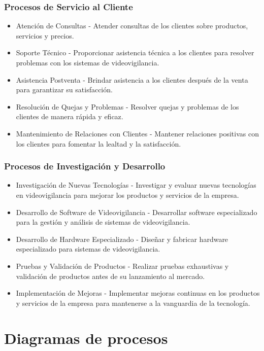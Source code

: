 \documentclass{report}
\begin{document}
        \subsubsection*{Procesos de Servicio al Cliente}
          \begin{itemize}
            \item Atención de Consultas - Atender consultas de los clientes sobre productos, servicios y precios.
            \item Soporte Técnico - Proporcionar asistencia técnica a los clientes para resolver problemas con los sistemas de videovigilancia.
            \item Asistencia Postventa - Brindar asistencia a los clientes después de la venta para garantizar su satisfacción.
            \item Resolución de Quejas y Problemas - Resolver quejas y problemas de los clientes de manera rápida y eficaz.
            \item Mantenimiento de Relaciones con Clientes - Mantener relaciones positivas con los clientes para fomentar la lealtad y la satisfacción.
          \end{itemize}
        \subsubsection*{Procesos de Investigación y Desarrollo}
          \begin{itemize}
            \item Investigación de Nuevas Tecnologías - Investigar y evaluar nuevas tecnologías en videovigilancia para mejorar los productos y servicios de la empresa.
            \item Desarrollo de Software de Videovigilancia - Desarrollar software especializado para la gestión y análisis de sistemas de videovigilancia.
            \item Desarrollo de Hardware Especializado - Diseñar y fabricar hardware especializado para sistemas de videovigilancia.
            \item Pruebas y Validación de Productos - Realizar pruebas exhaustivas y validación de productos antes de su lanzamiento al mercado.
            \item Implementación de Mejoras - Implementar mejoras continuas en los productos y servicios de la empresa para mantenerse a la vanguardia de la tecnología.
          \end{itemize}
      \clearpage\section{Diagramas de procesos}
\end{document}
